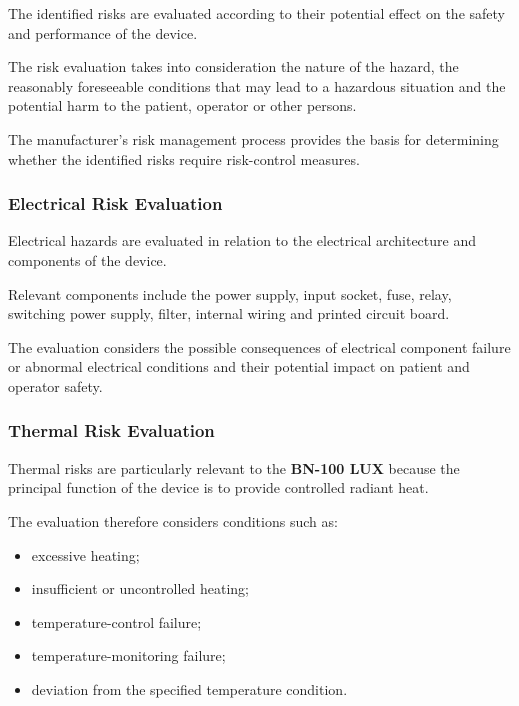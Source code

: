 The identified risks are evaluated according to their potential effect on
the safety and performance of the device.

The risk evaluation takes into consideration the nature of the hazard, the
reasonably foreseeable conditions that may lead to a hazardous situation and
the potential harm to the patient, operator or other persons.

The manufacturer's risk management process provides the basis for
determining whether the identified risks require risk-control measures.

\subsubsection{Electrical Risk Evaluation}

Electrical hazards are evaluated in relation to the electrical architecture
and components of the device.

Relevant components include the power supply, input socket, fuse, relay,
switching power supply, filter, internal wiring and printed circuit board.

The evaluation considers the possible consequences of electrical component
failure or abnormal electrical conditions and their potential impact on
patient and operator safety.

\subsubsection{Thermal Risk Evaluation}

Thermal risks are particularly relevant to the \textbf{BN-100 LUX} because
the principal function of the device is to provide controlled radiant heat.

The evaluation therefore considers conditions such as:

\begin{itemize}

    \item excessive heating;

    \item insufficient or uncontrolled heating;

    \item temperature-control failure;

    \item temperature-monitoring failure;

    \item deviation from the specified temperature condition.

\end{itemize}

